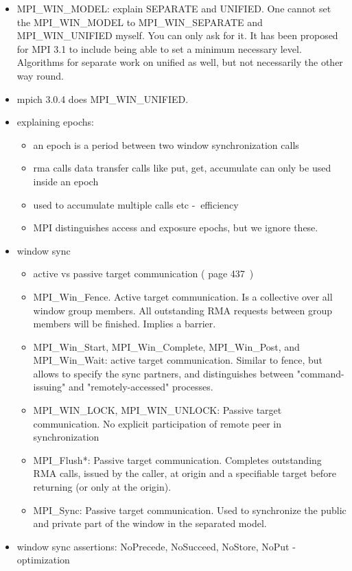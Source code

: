\documentclass[a4paper, 10pt]{article}
\begin{document}
\begin{itemize}
\begin{itemize}
			\item MPI\_WIN\_MODEL: explain SEPARATE and UNIFIED. One cannot set the MPI\_WIN\_MODEL to MPI\_WIN\_SEPARATE and MPI\_WIN\_UNIFIED myself. You can only ask for it. It has been proposed for MPI 3.1 to include being able to set a minimum necessary level. Algorithms for separate work on unified as well, but not necessarily the other way round.
			\item mpich 3.0.4 does MPI\_WIN\_UNIFIED.
			\item explaining epochs:
				\begin{itemize}
					\item an epoch is a period between two window synchronization calls
					\item rma calls data transfer calls like put, get, accumulate can only be used inside an epoch
					\item used to accumulate multiple calls etc -$\>$ efficiency
					\item MPI distinguishes access and exposure epochs, but we ignore these.
				\end{itemize}
			\item window sync
				\begin{itemize}
					\item active vs passive target communication (\cite{mpi3} page 437~)
					\item MPI\_Win\_Fence. Active target communication. Is a collective over all window group members. All outstanding RMA requests between group members will be finished. Implies a barrier.
					\item MPI\_Win\_Start, MPI\_Win\_Complete, MPI\_Win\_Post, and MPI\_Win\_Wait: active target communication. Similar to fence, but allows to specify the sync partners, and distinguishes between "command-issuing" and "remotely-accessed" processes.
					\item MPI\_WIN\_LOCK, MPI\_WIN\_UNLOCK: Passive target communication. No explicit participation of remote peer in synchronization
					\item MPI\_Flush*: Passive target communication. Completes outstanding RMA calls, issued by the caller, at origin and a specifiable target before returning (or only at the origin).
					\item MPI\_Sync: Passive target communication. Used to synchronize the public and private part of the window in the separated model.
				\end{itemize}
			\item window sync assertions: NoPrecede, NoSucceed, NoStore, NoPut -$\>$ optimization

\end{itemize}
\end{itemize}
\end{document}
